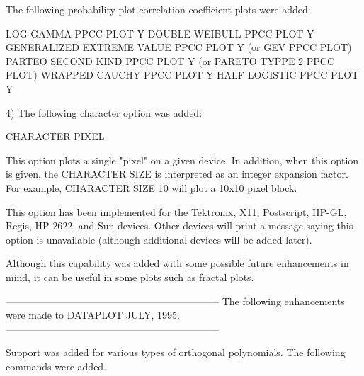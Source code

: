 {    The following probability plot correlation coefficient plots were
    added:

      LOG GAMMA PPCC PLOT Y
      DOUBLE WEIBULL PPCC PLOT Y
      GENERALIZED EXTREME VALUE PPCC PLOT Y  (or GEV PPCC PLOT)
      PARTEO SECOND KIND PPCC PLOT Y   (or PARETO TYPPE 2 PPCC PLOT)
      WRAPPED CAUCHY PPCC PLOT Y
      HALF LOGISTIC PPCC PLOT Y

 4) The following character option was added:

       CHARACTER PIXEL

    This option plots a single "pixel" on a given device.  In addition,
    when this option is given, the CHARACTER SIZE is interpreted as
    an integer expansion factor.  For example, CHARACTER SIZE 10 will
    plot a 10x10 pixel block.

    This option has been implemented for the Tektronix, X11,
    Postscript, HP-GL, Regis, HP-2622, and Sun devices.  Other devices
    will print a message saying this option is unavailable (although
    additional devices will be added later).

    Although this capability was added with some possible future
    enhancements in mind, it can be useful in some plots such as
    fractal plots.

-----------------------------------------------------------------
The following enhancements were made to DATAPLOT JULY, 1995.   
-----------------------------------------------------------------

Support was added for various types of orthogonal polynomials.
The following commands were added.

}
